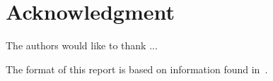 \documentclass[pdf,ps2pdf,11pt]{SANDreport}
\begin{document}
\section*{Acknowledgment}
The authors would like to thank ...

The format of this report is based on information found
in~{}\cite{Sand98-0730}.

%
\clearpage
\tableofcontents
\listoffigures




%
\SANDmain %
\end{document}
